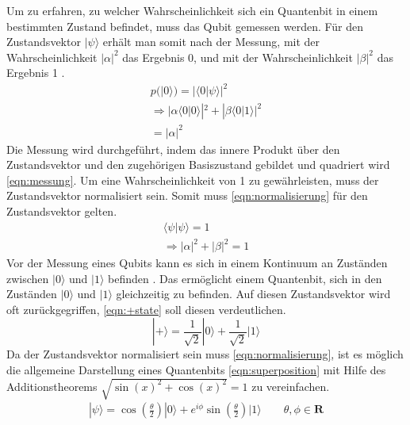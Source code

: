 Um zu erfahren, zu welcher Wahrscheinlichkeit sich ein Quantenbit in einem bestimmten Zustand befindet, muss das Qubit gemessen werden. F\"ur den Zustandsvektor $|\psi\rangle$ erh\"alt man somit nach der Messung, mit der Wahrscheinlichkeit $|\alpha|^2$ das Ergebnis 0, und mit der Wahrscheinlichkeit $|\beta|^2$ das Ergebnis 1 \cite{nielsen_chuang_2010}.
\begin{equation}\label{eqn:messung}
        \begin{gathered}
                p(|0\rangle) = |\langle 0|\psi \rangle|^2 \\
                \Rightarrow | \alpha \langle 0|0 \rangle|^2 + |\beta \langle 0|1 \rangle |^2 \\
                = | \alpha |^2
        \end{gathered}       
\end{equation}
Die Messung wird durchgef\"uhrt, indem das innere Produkt \"uber den Zustandsvektor und den zugeh\"origen Basiszustand gebildet und quadriert wird \ref{eqn:messung}. Um eine Wahrscheinlichkeit von 1 zu gew\"ahrleisten, muss der Zustandsvektor normalisiert sein. Somit muss \ref{eqn:normalisierung} f\"ur den Zustandsvektor gelten.
\begin{equation}\label{eqn:normalisierung}
\begin{gathered}
         \langle \psi | \psi \rangle = 1 \\
         \Rightarrow |\alpha|^2 +|\beta|^2 = 1
\end{gathered}
\end{equation}
Vor der Messung eines Qubits kann es sich in einem Kontinuum an Zust\"anden zwischen $|0\rangle$ und $|1\rangle$ befinden \cite{nielsen_chuang_2010}. Das erm\"oglicht einem Quantenbit, sich in den Zust\"anden $|0\rangle$ und $|1\rangle$ gleichzeitig zu befinden. Auf diesen Zustandsvektor wird oft zur\"uckgegriffen, \ref{eqn:+state} soll diesen verdeutlichen.
\begin{equation}\label{eqn:+state}
|+\rangle = \frac{1}{\sqrt{2}}|0\rangle+\frac{1}{\sqrt{2}}|1\rangle
\end{equation}
Da der Zustandsvektor normalisiert sein muss \ref{eqn:normalisierung}, ist es m\"oglich die allgemeine Darstellung eines Quantenbits \ref{eqn:superposition} mit Hilfe des Additionstheorems $\sqrt{\sin(x)^2+\cos(x)^2} = 1$ zu vereinfachen.
\begin{equation}\label{eqn:bloch-kugel}
\begin{gathered}
|\psi\rangle = \cos\left(\frac{\theta}{2}\right)|0\rangle+e^{i\phi}\sin\left(\frac{\theta}{2}\right)|1\rangle \qquad \theta, \phi \in \mathbf{R}
\end{gathered}
\end{equation}
